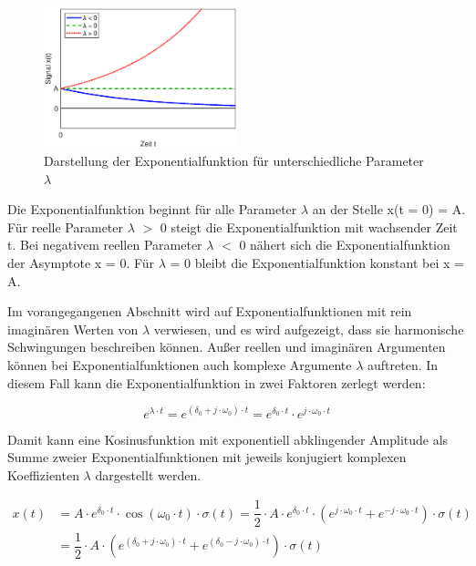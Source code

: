 \begin{figure}[ht]
  \centerline{\includegraphics[width=0.5\textwidth]{Kapitel1/Bilder/image24}}
  \caption{Darstellung der Exponentialfunktion f\"{u}r unterschiedliche Parameter $\lambda$ }
  \label{fig:Exponentialfunktion}
\end{figure}

\noindent Die Exponentialfunktion beginnt f\"{u}r alle Parameter $\lambda$ an der Stelle x(t = 0) = A. F\"{u}r reelle Parameter $\lambda$ $\mathrm{>}$ 0 steigt die Exponentialfunktion mit wachsender Zeit t. Bei negativem reellen Parameter $\lambda$ $\mathrm{<}$ 0 n\"{a}hert sich die Exponentialfunktion der Asymptote x = 0. F\"{u}r $\lambda$ = 0 bleibt die Exponentialfunktion konstant bei x = A.

\noindent Im vorangegangenen Abschnitt wird auf Exponentialfunktionen mit rein imagin\"{a}ren Werten von $\lambda$ verwiesen, und es wird aufgezeigt, dass sie harmonische Schwingungen beschreiben k\"{o}nnen. Au{\ss}er reellen und imagin\"{a}ren Argumenten k\"{o}nnen bei Exponentialfunktionen auch komplexe Argumente $\lambda$ auftreten. In diesem Fall kann die Exponentialfunktion in zwei Faktoren zerlegt werden:

\begin{equation}\label{eq:oneninetyfive}
e^{\lambda \cdot t} =e^{\left(\delta _{0} +j\cdot \omega _{0} \right)\cdot t} =e^{\delta _{0} \cdot t} \cdot e^{j\cdot \omega _{0} \cdot t}
\end{equation}

\noindent Damit kann eine Kosinusfunktion mit exponentiell abklingender Amplitude als Summe zweier Exponentialfunktionen mit jeweils konjugiert komplexen Koeffizienten $\lambda$ dargestellt werden. 

\begin{equation}\label{eq:oneninetysix}
\begin{split}
x(t) & ={A\cdot e^{\delta _{0} \cdot t} \cdot \cos \left(\omega _{0} \cdot t\right)\cdot \sigma \left(t\right)=\dfrac{1}{2} \cdot A\cdot e^{\delta _{0} \cdot t} \cdot \left(e^{j\cdot \omega _{0} \cdot t} +e^{-j\cdot \omega _{0} \cdot t} \right)\cdot \sigma \left(t\right)} \\
& = \dfrac{1}{2} \cdot A\cdot \left(e^{\left(\delta _{0} +j\cdot \omega _{0} \right)\cdot t} +e^{\left(\delta _{0} -j\cdot \omega _{0} \right)\cdot t} \right)\cdot \sigma \left(t\right)    
\end{split}
\end{equation}


